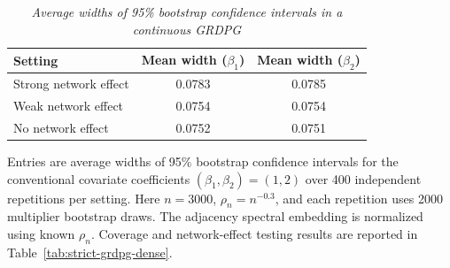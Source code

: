 \begin{table}[htbp]
\centering
\small
\caption{\textit{Average widths of 95\% bootstrap confidence intervals in a continuous GRDPG}}
\label{tab:strict-grdpg-dense-width}
\renewcommand{\arraystretch}{1.2}
\begin{tabular}{lcc}
\toprule
Setting & Mean width ($\beta_1$) & Mean width ($\beta_2$) \\
\midrule
Strong network effect & 0.0783 & 0.0785 \\
Weak network effect & 0.0754 & 0.0754 \\
No network effect & 0.0752 & 0.0751 \\
\bottomrule
\end{tabular}
\par\smallskip
\begin{minipage}{0.98\linewidth}\footnotesize
Entries are average widths of 95\% bootstrap confidence intervals for the conventional covariate coefficients $(\beta_1,\beta_2)=(1,2)$ over 400 independent repetitions per setting. Here $n=3000$, $\rho_n=n^{-0.3}$, and each repetition uses 2000 multiplier bootstrap draws. The adjacency spectral embedding is normalized using known $\rho_n$. Coverage and network-effect testing results are reported in Table~\ref{tab:strict-grdpg-dense}.
\end{minipage}
\end{table}
